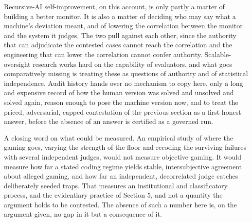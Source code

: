 \documentclass[11pt]{article}
\begin{document}
Recursive-AI self-improvement, on this account, is only partly a matter of building a better monitor. It is also a matter of deciding who may say what a machine's deviation meant, and of lowering the correlation between the monitor and the system it judges. The two pull against each other, since the authority that can adjudicate the contested cases cannot reach the correlation and the engineering that can lower the correlation cannot confer authority. Scalable-oversight research works hard on the capability of evaluators, and what goes comparatively missing is treating these as questions of authority and of statistical independence. Audit history hands over no mechanism to copy here, only a long and expensive record of how the human version was solved and unsolved and solved again, reason enough to pose the machine version now, and to treat the priced, adversarial, capped contestation of the previous section as a first honest answer, before the absence of an answer is certified as a governed run.

A closing word on what could be measured. An empirical study of where the gaming goes, varying the strength of the floor and recoding the surviving failures with several independent judges, would not measure objective gaming. It would measure how far a stated coding regime yields stable, intersubjective agreement about alleged gaming, and how far an independent, decorrelated judge catches deliberately seeded traps. That measures an institutional and classificatory process, and the evidentiary practice of Section 5, and not a quantity the argument holds to be contested. The absence of such a number here is, on the argument given, no gap in it but a consequence of it.


\end{document}
